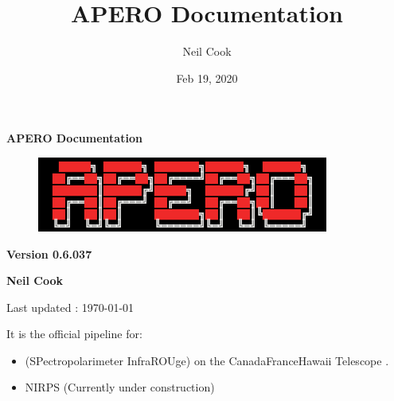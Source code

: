 \documentclass[a4paper,10pt,english]{report}
\title{APERO Documentation}
\date{Feb 19, 2020}
\author{Neil Cook}
\begin{document}
\pagestyle{empty}


        \begin{titlepage}
            \centering

            \vspace*{40mm} %
            \textbf{\Huge {APERO Documentation}}

            \vspace{5mm}
            \begin{figure}[!h]
                \centering
                \includegraphics[scale=1]{apero_logo.png}
            \end{figure}
            
            \vspace{5mm}
            \Large \textbf{Version 0.6.037}
            
            \vspace{5mm}
            \Large \textbf{{Neil Cook}}

            \vspace*{0mm}
            \small  Last updated : \MonthYearFormat\today


        \end{titlepage}

        \clearpage
        \tableofcontents

        
\pagestyle{plain}
 
\pagestyle{normal}
\label{\detokenize{index::doc}}


It is the official pipeline for:
\begin{itemize}
\item {} 
 (SPectropolarimeter InfraROUge) on the Canada\sphinxhyphen{}France\sphinxhyphen{}Hawaii Telescope .

\item {} 
NIRPS (Currently under construction)

\end{itemize}
\end{document}

